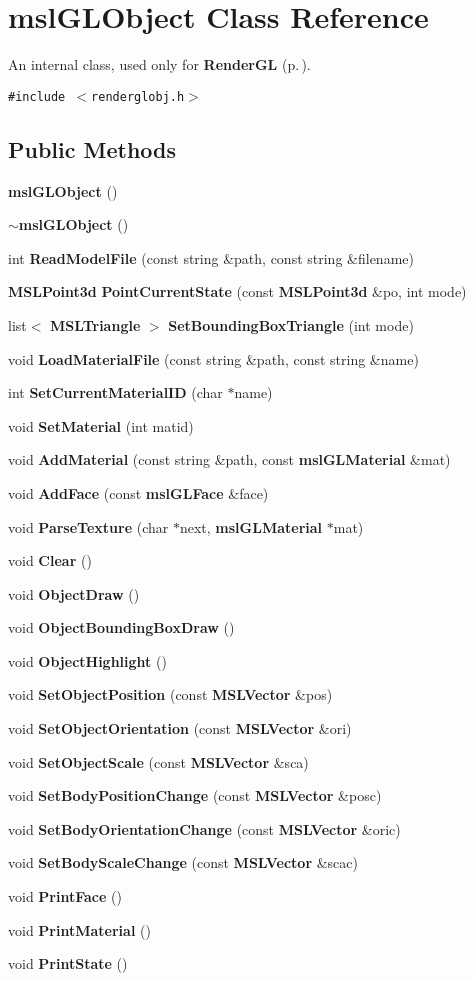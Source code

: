 \section{msl\-GLObject  Class Reference}
\label{classmslGLObject}
An internal class, used only for {\bf Render\-GL} {\rm (p.\,\pageref{classRenderGL})}. 


{\tt \#include $<$renderglobj.h$>$}

\subsection*{Public Methods}
\begin{CompactItemize}
\item 
{\bf msl\-GLObject} ()
\item 
{\bf $\sim$msl\-GLObject} ()
\item 
int {\bf Read\-Model\-File} (const string \&path, const string \&filename)
\item 
{\bf MSLPoint3d} {\bf Point\-Current\-State} (const {\bf MSLPoint3d} \&po, int mode)
\item 
list$<$ {\bf MSLTriangle} $>$ {\bf Set\-Bounding\-Box\-Triangle} (int mode)
\item 
void {\bf Load\-Material\-File} (const string \&path, const string \&name)
\item 
int {\bf Set\-Current\-Material\-ID} (char $\ast$name)
\item 
void {\bf Set\-Material} (int matid)
\item 
void {\bf Add\-Material} (const string \&path, const {\bf msl\-GLMaterial} \&mat)
\item 
void {\bf Add\-Face} (const {\bf msl\-GLFace} \&face)
\item 
void {\bf Parse\-Texture} (char $\ast$next, {\bf msl\-GLMaterial} $\ast$mat)
\item 
void {\bf Clear} ()
\item 
void {\bf Object\-Draw} ()
\item 
void {\bf Object\-Bounding\-Box\-Draw} ()
\item 
void {\bf Object\-Highlight} ()
\item 
void {\bf Set\-Object\-Position} (const {\bf MSLVector} \&pos)
\item 
void {\bf Set\-Object\-Orientation} (const {\bf MSLVector} \&ori)
\item 
void {\bf Set\-Object\-Scale} (const {\bf MSLVector} \&sca)
\item 
void {\bf Set\-Body\-Position\-Change} (const {\bf MSLVector} \&posc)
\item 
void {\bf Set\-Body\-Orientation\-Change} (const {\bf MSLVector} \&oric)
\item 
void {\bf Set\-Body\-Scale\-Change} (const {\bf MSLVector} \&scac)
\item 
void {\bf Print\-Face} ()
\item 
void {\bf Print\-Material} ()
\item 
void {\bf Print\-State} ()
\end{CompactItemize}
